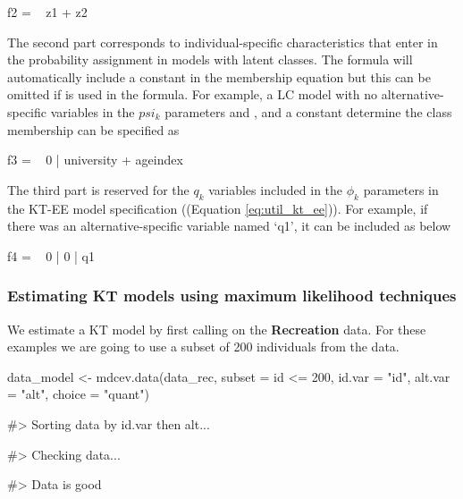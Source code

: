 \begin{Schunk}
\begin{Sinput}
f2 = ~ z1 + z2
\end{Sinput}
\end{Schunk}

The second part corresponds to individual-specific characteristics that
enter in the probability assignment in models with latent classes. The
formula will automatically include a constant in the membership equation
but this can be omitted if  is used in the formula. For
example, a LC model with no alternative-specific variables in the
\(psi_k\) parameters and ,  and a
constant determine the class membership can be specified as

\begin{Schunk}
\begin{Sinput}
f3 = ~ 0 | university + ageindex
\end{Sinput}
\end{Schunk}

The third part is reserved for the \(q_k\) variables included in the
\(\phi_k\) parameters in the KT-EE model specification ((Equation
\ref{eq:util_kt_ee})). For example, if there was an alternative-specific
variable named `q1', it can be included as below

\begin{Schunk}
\begin{Sinput}
f4 = ~ 0 | 0 | q1
\end{Sinput}
\end{Schunk}

\hypertarget{estimating-kt-models-using-maximum-likelihood-techniques}{%
\subsubsection{Estimating KT models using maximum likelihood
techniques}\label{estimating-kt-models-using-maximum-likelihood-techniques}}

We estimate a KT model by first calling  on the
\textbf{Recreation} data. For these examples we are going to use a
subset of 200 individuals from the data.

\begin{Schunk}
\begin{Sinput}
data_model <- mdcev.data(data_rec, subset = id <= 200,
                       id.var = "id",
                       alt.var = "alt",
                       choice = "quant")  
\end{Sinput}
\begin{Soutput}
#> Sorting data by id.var then alt...
\end{Soutput}
\begin{Soutput}
#> Checking data...
\end{Soutput}
\begin{Soutput}
#> Data is good
\end{Soutput}
\end{Schunk}

